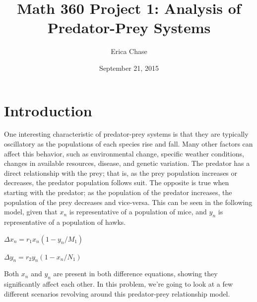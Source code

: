 \documentclass[10pt,letterpaper]{article}
\begin{document}
	\title{Math 360 Project 1: Analysis of Predator-Prey Systems}
	\author{Erica Chase}
	\date {September 21, 2015}
	\maketitle
	\section{Introduction}
		One interesting characteristic of predator-prey systems is that they are typically oscillatory as the populations of each species rise and fall. Many other factors can affect this behavior, such as environmental change, specific weather conditions, changes in available resources, disease, and genetic variation. The predator has a direct relationship with the prey; that is, as the prey population increases or decreases, the predator population follows suit. The opposite is true when starting with the predator; as the population of the predator increases, the population of the prey decreases and vice-versa.
		\newline \newline
		This can be seen in the following model, given that $x_{n}$ is representative of a population of mice, and $y_{n}$ is representative of a population of hawks.
		\newline \newline
		\centerline{$\Delta x_{n} = r_{1} x_{n} (1 - y_{n} / M_{1})$}
		\newline
		\centerline{$\Delta y_{n} = r_{2} y_{n} (1 - x_{n} / N_{1})$}
		\newline \newline
		Both $x_{n}$ and $y_{n}$ are present in both difference equations, showing they significantly affect each other. In this problem, we're going to look at a few different scenarios revolving around this predator-prey relationship model.
\end{document}
